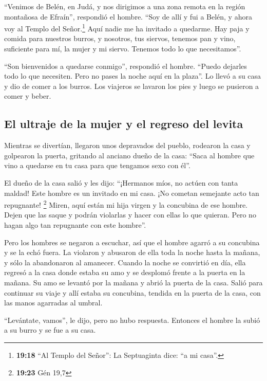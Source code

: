  ``Venimos de Belén, en Judá, y nos dirigimos a una zona
remota en la región montañosa de Efraín'', respondió el hombre. ``Soy de
allí y fui a Belén, y ahora voy al Templo del Señor.\footnote{\textbf{19:18}
  ``Al Templo del Señor'': La Septuaginta dice: ``a mi casa''.} Aquí
nadie me ha invitado a quedarme.  Hay paja y comida para
nuestros burros, y nosotros, tus siervos, tenemos pan y vino, suficiente
para mí, la mujer y mi siervo. Tenemos todo lo que necesitamos''.

 ``Son bienvenidos a quedarse conmigo'', respondió el
hombre. ``Puedo dejarles todo lo que necesiten. Pero no pases la noche
aquí en la plaza''.  Lo llevó a su casa y dio de comer a
los burros. Los viajeros se lavaron los pies y luego se pusieron a comer
y beber.

\hypertarget{el-ultraje-de-la-mujer-y-el-regreso-del-levita}{%
\subsection{El ultraje de la mujer y el regreso del
levita}\label{el-ultraje-de-la-mujer-y-el-regreso-del-levita}}

 Mientras se divertían, llegaron unos depravados del
pueblo, rodearon la casa y golpearon la puerta, gritando al anciano
dueño de la casa: ``Saca al hombre que vino a quedarse en tu casa para
que tengamos sexo con él''.

 El dueño de la casa salió y les dijo: ``¡Hermanos míos,
no actúen con tanta maldad! Este hombre es un invitado en mi casa. ¡No
cometan semejante acto tan repugnante! \footnote{\textbf{19:23} Gén 19,7}
 Miren, aquí están mi hija virgen y la concubina de ese
hombre. Dejen que las saque y podrán violarlas y hacer con ellas lo que
quieran. Pero no hagan algo tan repugnante con este hombre''.

 Pero los hombres se negaron a escuchar, así que el
hombre agarró a su concubina y se la echó fuera. La violaron y abusaron
de ella toda la noche hasta la mañana, y sólo la abandonaron al
amanecer.  Cuando la noche se convirtió en día, ella
regresó a la casa donde estaba su amo y se desplomó frente a la puerta
en la mañana.  Su amo se levantó por la mañana y abrió la
puerta de la casa. Salió para continuar su viaje y allí estaba su
concubina, tendida en la puerta de la casa, con las manos agarradas al
umbral.

 ``Levántate, vamos'', le dijo, pero no hubo respuesta.
Entonces el hombre la subió a su burro y se fue a su casa.

